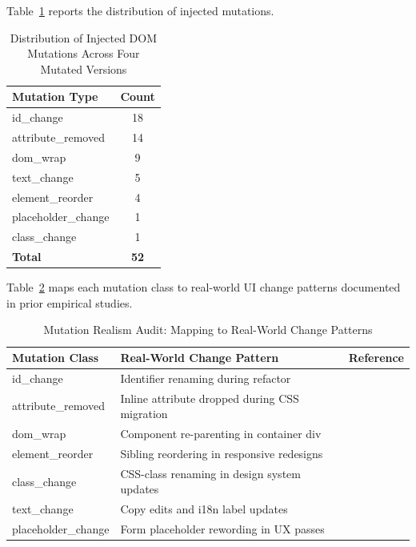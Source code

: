 \documentclass[12pt]{article}
\begin{document}
Table~\ref{tab:mutations} reports the distribution of injected mutations.

\begin{table}[H]
\centering
\caption{Distribution of Injected DOM Mutations Across Four Mutated Versions}
\label{tab:mutations}
\begin{tabular}{lc}
\toprule
Mutation Type & Count \\
\midrule
id\_change & 18 \\
attribute\_removed & 14 \\
dom\_wrap & 9 \\
text\_change & 5 \\
element\_reorder & 4 \\
placeholder\_change & 1 \\
class\_change & 1 \\
\midrule
\textbf{Total} & \textbf{52} \\
\bottomrule
\end{tabular}
\end{table}

Table~\ref{tab:mutation_realism} maps each mutation class to real-world UI change patterns documented in prior empirical studies.

\begin{table}[H]
\centering
\caption{Mutation Realism Audit: Mapping to Real-World Change Patterns}
\label{tab:mutation_realism}
\begin{tabular}{p{3.5cm}p{7cm}p{3cm}}
\toprule
Mutation Class & Real-World Change Pattern & Reference \\
\midrule
id\_change & Identifier renaming during refactor & \cite{hammoudi2016, stocco2018} \\
attribute\_removed & Inline attribute dropped during CSS migration & \cite{hammoudi2016} \\
dom\_wrap & Component re-parenting in container div & \cite{yandrapally2014, ricca2019} \\
element\_reorder & Sibling reordering in responsive redesigns & \cite{yandrapally2014} \\
class\_change & CSS-class renaming in design system updates & \cite{hammoudi2016, stocco2018} \\
text\_change & Copy edits and i18n label updates & \cite{ricca2019} \\
placeholder\_change & Form placeholder rewording in UX passes & \cite{hammoudi2016} \\
\bottomrule
\end{tabular}
\end{table}
\end{document}
